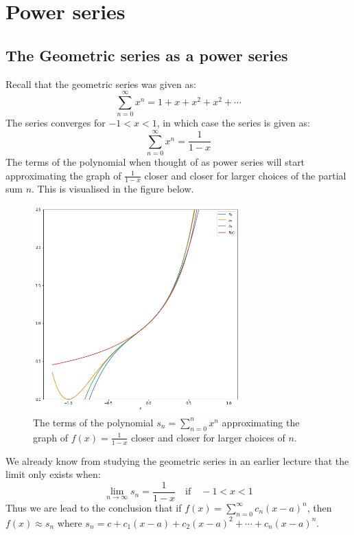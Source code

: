 \documentclass[11pt, a4paper]{article}
\numberwithin{equation}{section}
\numberwithin{figure}{section}
\begin{document}
\setcounter{section}{4}
\section{Power series}

\subsection{The Geometric series as a power series}
Recall that the geometric series was given as:
\begin{equation}
    \sum_{n=0}^\infty x^n = 1 + x + x^2 + x^2 + \cdots
\end{equation}
The series converges for $-1 < x < 1$, in which case the series is given as:
\begin{equation}
    \sum_{n=0}^\infty x^n = \frac{1}{1-x}
\end{equation}
The terms of the polynomial when thought of as power series will start approximating the graph of $\frac{1}{1 -x}$ closer and closer for larger choices of the partial sum $n$. This is visualised in the figure below.
\begin{figure}[H]
  \centerline{\includegraphics[width=80mm]{images/Approximating_f.png}}
  \caption{The terms of the polynomial $s_n = \sum_{n=0}^n x^n$ approximating the graph of $f(x) = \frac{1}{1-x}$ closer and closer for larger choices of $n$.}
\end{figure}
We already know from studying the geometric series in an earlier lecture that the limit only exists when:
\begin{equation}
    \lim_{n\to\infty} s_n = \frac{1}{1-x} \quad \text{if} \quad -1 < x < 1
\end{equation}
Thus we are lead to the conclusion that if $f(x) = \sum_{n=0}^\infty c_n(x-a)^n$, then $f(x)\approx s_n$ where $s_n =c + c_1(x-a) + c_2(x-a)^2 + \cdots + c_n(x-a)^n$.\\
\end{document}
